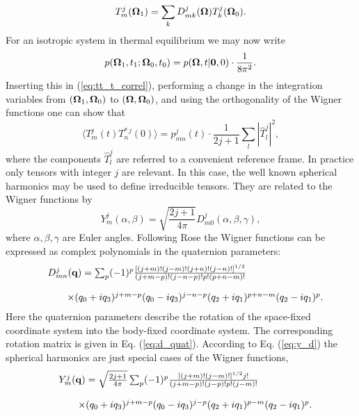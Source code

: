 \documentclass[a4paper,11pt]{report}
\begin{document}
\begin{equation}
T^j_m({\bf\Omega}_1) = \sum_k D^{j}_{m k}({\bf \Omega})
T^j_k({\bf\Omega}_0).
\end{equation}
For an isotropic system in thermal equilibrium we may now write
\begin{equation}
p({\bf\Omega}_1,t_1;{\bf\Omega}_0,t_0) =  
p({\bf\Omega},t|{\bf 0},0)\cdot\frac{1}{8\pi^2}.
\end{equation}
Inserting this in (\ref{eq:tt_t_correl}), performing a change in the integration variables from 
$({\bf\Omega}_1,{\bf\Omega}_0)$ to $({\bf\Omega},{\bf\Omega}_0)$, and using the orthogonality of the Wigner functions one 
can show that
\begin{equation}
\label{eq:p_tt}
\langle T^j_m(t) T^{*\,j}_n(0) \rangle =
p^j_{m n}(t) \cdot \frac{1}{2j + 1} \sum_{l}|\hat T^j_l|^2,
\end{equation}
where the components $\hat T^j_l$ are referred to a convenient reference frame. In practice only tensors with integer $j$  
are relevant. In this case, the well known spherical harmonics  \cite{Edmonds,Satchler} may be used to define irreducible tensors.
They are related to the Wigner functions by
\begin{equation}
\label{eq:y_d}
Y^j_m(\alpha,\beta) = \sqrt{\frac{2j+1}{4\pi}}
D^j_{m 0}(\alpha,\beta,\gamma),
\end{equation}
where $\alpha,\beta,\gamma$ are Euler angles. Following {\sc Rose} \cite{Rose} the Wigner functions can be expressed  as 
complex polynomials in the quaternion parameters:
\begin{equation}
\label{eq:wig_q}
\begin{array}{ll}
 &D^{j}_{m n}({\bf q}) = 
        \sum_{p}(-1)^{p}
        \frac{\left[(j+m)!(j-m)!(j+n)!(j-n)!\right]^{1/2}}
             {(j+m-p)!(j-n-p)!p!(p+n-m)!}\\
  &\\
  &\qquad\times (q_0+iq_3)^{j+m-p}(q_0-iq_3)^{j-n-p}
   (q_2+iq_1)^{p+n-m}(q_2-iq_1)^{p}.
\end{array}
\end{equation}
Here the quaternion parameters describe the rotation of the space-fixed coordinate system into the body-fixed coordinate 
system. The corresponding rotation matrix is given in Eq.  (\ref{eq:d_quat}). According to Eq.  (\ref{eq:y_d}) the spherical 
harmonics are just special cases of the Wigner functions,
\begin{equation}
\label{eq:y_q}
\begin{array}{ll}
 &Y^j_m({\bf q}) = \sqrt{\frac{2j+1}{4\pi}} 
        \sum_{p}(-1)^{p}
        \frac{\left[(j+m)!(j-m)!\right]^{1/2} j!}
             {(j+m-p)!(j-p)!p!(j-m)!}\\
  &\\  &\qquad\times(q_0+iq_3)^{j+m-p}(q_0-iq_3)^{j-p}
   (q_2+iq_1)^{p-m}(q_2-iq_1)^{p}.
\end{array}
\end{equation}
\end{document}

